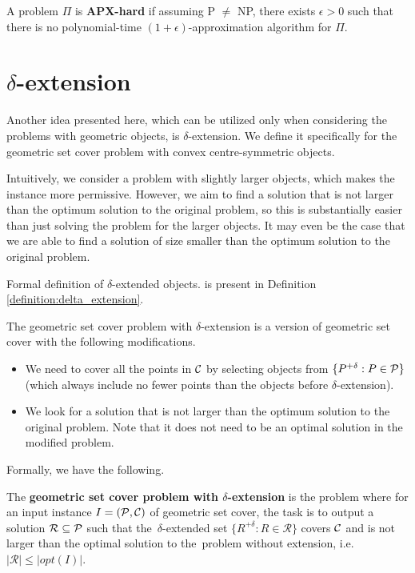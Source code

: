 \begin{defi}
A problem $\Pi$ is \textbf{APX-hard} if assuming P $\neq$ NP,
there exists $\epsilon > 0$
such that there is no polynomial-time $(1+\epsilon)$-approximation algorithm
for $\Pi$.
\end{defi}

\section{$\delta$-extension}
\label{section:def:delta_extension}

Another idea presented here, which can be utilized only when considering
the problems with geometric objects,
is $\delta$-extension.
We define it specifically for the geometric set cover problem
with convex centre-symmetric objects.

Intuitively, we consider a problem with slightly larger objects,
which makes the instance more permissive.
However, we aim to find a solution that
is not larger than the
optimum solution to the original problem,
so this is substantially easier than just
solving the problem for the larger objects.
It may even be the case
that we are able to find a solution
of size smaller than the optimum solution
to the original problem.

Formal definition of $\delta$-extended objects.
is present in Definition
\ref{definition:delta_extension}.

The geometric set cover problem with $\delta$-extension
is a version of geometric set cover with
the following modifications.
\begin{itemize}
\item We need to cover all the points in $\mathcal{C}$
by selecting objects from $\{P^{+\delta} : P \in \mathcal{P}\}$ (which always 
include no fewer points than the objects
before $\delta$-extension).
\item We look for a solution that is not larger than the optimum
solution to the original problem.
Note that it does not need to be an optimal solution in
the modified problem.
\end{itemize}
Formally, we have the following.

\begin{defi}
The \textbf{geometric set cover problem
with $\delta$-extension} is the problem where for an input instance
$I=(\mathcal{P}, \mathcal{C})$ of geometric set cover,
the task is to output a solution $\mathcal{R} \subseteq \mathcal{P}$
such that the~$\delta$-extended set
$\{ R^{+\delta} :  R \in \mathcal{R} \}$ covers $\mathcal{C}$
and is not larger than the optimal solution to the~problem without
extension, i.e.~$|\mathcal{R}| \le |opt(I)|$.
\end{defi}

